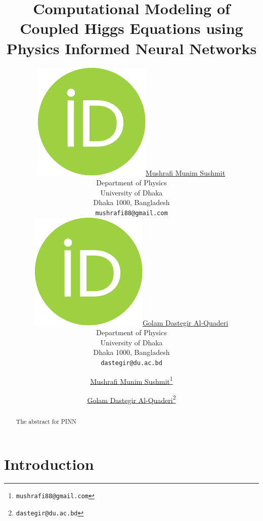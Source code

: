 \documentclass{article}
\title{Computational Modeling of Coupled Higgs Equations using Physics Informed Neural Networks }
\author{ \href{https://orcid.org/0009-0003-2515-9464}{\includegraphics[scale=0.06]{orcid.pdf}\hspace{1mm}Mushrafi Munim Sushmit} \\
	Department of Physics\\
	University of Dhaka\\
	Dhaka 1000, Bangladesh \\
	\texttt{mushrafi88@gmail.com} \\
	\And
	\href{https://orcid.org/0000-0002-9231-4167}{\includegraphics[scale=0.06]{orcid.pdf}\hspace{1mm}Golam Dastegir Al-Quaderi } \\
	Department of Physics\\
	University of Dhaka\\
	Dhaka 1000, Bangladesh \\
	\texttt{dastegir@du.ac.bd} \\ 
}
\author[1]{%
	\href{https://orcid.org/0009-0003-2515-9464}{\usebox{\orcid}\hspace{1mm}Mushrafi Munim Sushmit\thanks{\texttt{mushrafi88@gmail.com}}}%
}
\author[2]{%
	\href{https://orcid.org/0000-0002-9231-4167}{\usebox{\orcid}\hspace{1mm}Golam Dastegir Al-Quaderi\thanks{\texttt{dastegir@du.ac.bd}}}%
}
\affil[1,2]{Department of Physics, University of Dhaka, Dhaka 1000, Bangladesh}
\begin{document}
\maketitle

\begin{abstract}
	The abstract for PINN 
\end{abstract}


 

\section{Introduction}



 
\end{document}
